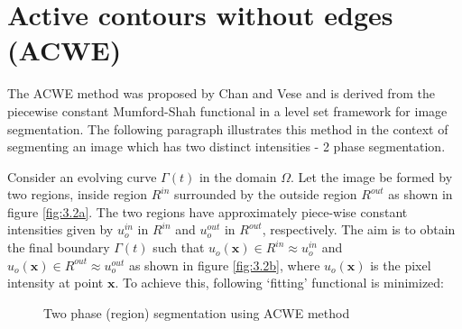 \documentclass[10pt,letterpaper, onecolumn]{article}
\begin{document}
\section{Active contours without edges (ACWE)}
The ACWE method was proposed by Chan and Vese \cite{chan2001active} and is derived from the piecewise constant Mumford-Shah functional in a level set framework for image segmentation. The following paragraph illustrates this method in the context of segmenting an image which has two distinct intensities - 2 phase segmentation.

 Consider an evolving curve  $\Gamma(t)$ in the domain $\Omega$. Let the image be formed by two regions, 
inside region $R^{in}$ surrounded by the outside region $R^{out}$ as shown in figure \ref{fig:3.2a}. The two regions have approximately piece-wise constant intensities given by
$u_o^{in}$ in $R^{in}$ and $u_o^{out}$ in $R^{out}$, respectively. The aim is to obtain the final boundary
$\Gamma(t)$ such that $u_o(\bm{x}) \in R^{in} \approx u_o^{in}$ and $u_o(\bm{x}) \in R^{out} \approx u_o^{out}$ 
as shown in figure \ref{fig:3.2b}, where $u_o(\bm{x})$
is the pixel intensity at point $\bm{x}$. To achieve this, following ‘fitting’ functional is minimized:
%
\begin{figure}[H]
  \begin{center}
     \hfill %
  \end{center}
  \caption{Two phase (region) segmentation using ACWE method }
  \label{fig:3.2}
\end{figure}
\end{document}
